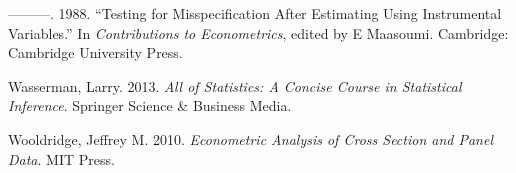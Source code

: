 \documentclass[
  12pt,
]{article}
\newlength{\cslhangindent}
\newenvironment{cslreferences}%
  {\setlength{\parindent}{0pt}%
  \everypar{\setlength{\hangindent}{\cslhangindent}}\ignorespaces}%
  {\par}
\begin{document}
\begin{cslreferences}
\leavevmode\hypertarget{ref-Sargan1988}{}%
---------. 1988. ``Testing for Misspecification After Estimating Using Instrumental Variables.'' In \emph{Contributions to Econometrics}, edited by E Maasoumi. Cambridge: Cambridge University Press.

\leavevmode\hypertarget{ref-wasserman2013all}{}%
Wasserman, Larry. 2013. \emph{All of Statistics: A Concise Course in Statistical Inference}. Springer Science \& Business Media.

\leavevmode\hypertarget{ref-JMW10}{}%
Wooldridge, Jeffrey M. 2010. \emph{Econometric Analysis of Cross Section and Panel Data}. MIT Press.
\end{cslreferences}
\end{document}
